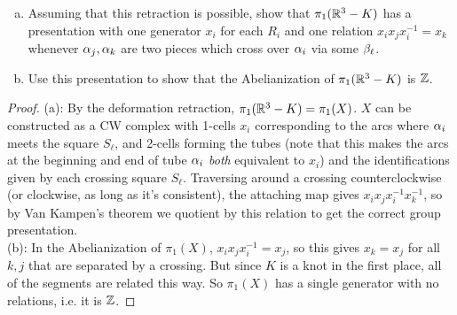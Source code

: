 \documentclass{amsart}
\begin{document}
\begin{enumerate}[(a)]
	\item Assuming that this retraction is possible, show that $\pi_1(\mathbb{R}^3-K)$ has a presentation with one generator $x_i$ for each $R_i$ and one relation $x_ix_jx_i^{-1}=x_k$ whenever $\alpha_j,\alpha_k$ are two pieces which cross over $\alpha_i$ via some $\beta_{\ell}$.
	\item Use this presentation to show that the Abelianization of $\pi_1(\mathbb{R}^3-K)$ is $\mathbb{Z}$.
\end{enumerate}
\begin{proof}
	(a): By the deformation retraction, $\pi_1(\mathbb{R}^3-K)=\pi_1(X)$. $X$ can be constructed as a CW complex with 1-cells $x_i$ corresponding to the arcs where $\alpha_i$ meets the square $S_{\ell}$, and 2-cells forming the tubes (note that this makes the arcs at the beginning and end of tube $\alpha_i$ \textit{both} equivalent to $x_i$) and the identifications given by each crossing square $S_{\ell}$. Traversing around a crossing counterclockwise (or clockwise, as long as it's consistent), the attaching map gives $x_ix_jx_i^{-1}x_k^{-1}$, so by Van Kampen's theorem we quotient by this relation to get the correct group presentation.\\
	
	(b): In the Abelianization of $\pi_1(X)$, $x_ix_jx_i^{-1}=x_j$, so this gives $x_k=x_j$ for all $k,j$ that are separated by a crossing. But since $K$ is a knot in the first place, all of the segments are related this way. So $\pi_1(X)$ has a single generator with no relations, i.e. it is $\mathbb{Z}$.
\end{proof}
\end{document}
